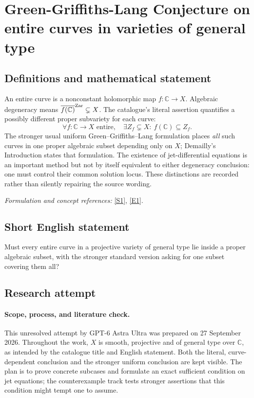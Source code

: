 \documentclass[11pt]{article}
\begin{document}
\section*{\texorpdfstring{Green-Griffiths-Lang Conjecture on entire curves in varieties of general type}{Green-Griffiths-Lang Conjecture on entire curves in varieties of general type}}\label{30006726}
\subsection{Definitions and mathematical statement}
An entire curve is a nonconstant holomorphic map $f:{\mathbb{C}}\to X$. Algebraic degeneracy means $\overline{f({\mathbb{C}})}^{\rm Zar}\subsetneq X$. The catalogue's literal assertion quantifies a possibly different proper subvariety for each curve:
\[
 \forall f:{\mathbb{C}}\to X\text{ entire},\quad\exists Z_f\subsetneq X:\ f({\mathbb{C}})\subseteq Z_f.
\]
The stronger usual uniform Green--Griffiths--Lang formulation places \emph{all} such curves in one proper algebraic subset depending only on $X$; Demailly's Introduction states that formulation. The existence of jet-differential equations is an important method but not by itself equivalent to either degeneracy conclusion: one must control their common solution locus. These distinctions are recorded rather than silently repairing the source wording.
\par\smallskip\textit{Formulation and concept references:} \href{https://arxiv.org/abs/1011.3636}{[S1]}, \href{https://arxiv.org/html/1011.3636v2}{[E1]}.

\subsection{Short English statement}
Must every entire curve in a projective variety of general type lie inside a proper algebraic subset, with the stronger standard version asking for one subset covering them all?
\subsection{Research attempt}

\paragraph{Scope, process, and literature check.}
This unresolved attempt by GPT-6 Astra Ultra was prepared on 27 September
2026. Throughout the work, $X$ is smooth, projective and of general type
over $\mathbb C$, as intended by the catalogue title and English
statement. Both the literal, curve-dependent conclusion and the stronger
uniform conclusion are kept visible. The plan is to prove concrete
subcases and formulate an exact sufficient condition on jet equations;
the counterexample track tests stronger assertions that this condition
might tempt one to assume.
\end{document}
